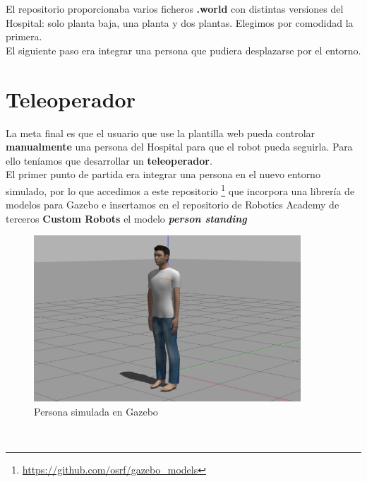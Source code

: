 El repositorio proporcionaba varios ficheros \textbf{.world} con distintas versiones del Hospital: solo planta baja, una planta y dos plantas. Elegimos por comodidad la primera.\\

El siguiente paso era integrar una persona que pudiera desplazarse por el entorno.\\



\section{Teleoperador}
\label{sec:teleoperador}

La meta final es que el usuario que use la plantilla web pueda controlar \textbf{manualmente} una persona del Hospital para que el robot pueda seguirla. Para ello teníamos que desarrollar un \textbf{teleoperador}.\\

El primer punto de partida era integrar una persona en el nuevo entorno simulado, por lo que accedimos a este repositorio \footnote{\url{https://github.com/osrf/gazebo_models}} que incorpora una librería de modelos para Gazebo e insertamos en el repositorio de Robotics Academy de terceros \textbf{Custom Robots} el modelo \textbf{\textit{person standing}}\\

\begin{figure} [H]
  \begin{center}
    \includegraphics[width=10cm]{imagenes/person_model.png}
  \end{center}
  \caption[Persona simulada en Gazebo]{Persona simulada en Gazebo}
  \label{fig:persona_gazebo}
\end{figure}\

